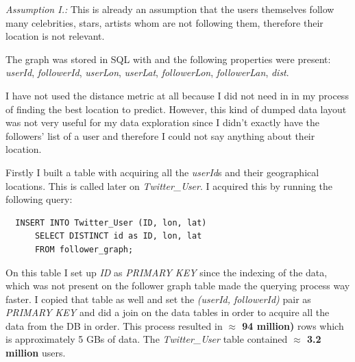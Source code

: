 \documentclass[a4paper,12pt]{article}
\begin{document}
\vspace{.2cm}

\par \textit{Assumption I.:} This is already an assumption that the users
themselves follow many celebrities, stars, artists whom are not following 
them, therefore their location is not relevant.

\vspace{.2cm}

\par The graph was stored in SQL with and the following properties were
present: \textit{userId}, \textit{followerId}, \textit{userLon}, \textit{userLat},
\textit{followerLon}, \textit{followerLan}, \textit{dist}.

\vspace{.2cm}

\par I have not used the distance metric at all because I did not need in
in my process of finding the best location to predict. However, this kind
of dumped data layout was not very useful for my data exploration since I
didn't exactly have the followers' list of a user and therefore I could not
say anything about their location.

\vspace{.2cm}

\par Firstly I built a table with acquiring all the \textit{userId}s and 
their geographical locations. This is called later on \textit{Twitter\_User}. 
I acquired this by running the following query:

\vspace{.2cm}

\lstset{language=SQL}
\lstset{frame=lines}
\lstset{basicstyle=\footnotesize}
\begin{lstlisting}
  INSERT INTO Twitter_User (ID, lon, lat)
      SELECT DISTINCT id as ID, lon, lat
      FROM follower_graph;
\end{lstlisting}

\vspace{.2cm}

\par On this table I set up \textit{ID} as \textit{PRIMARY KEY} since
the indexing of the data, which was not present on the follower graph table
made the querying process way faster. I copied that table as well and set
the \textit{(userId, followerId)} pair as \textit{PRIMARY KEY} and did a join
on the data tables in order to acquire all the data from the DB in order.
This process resulted in \textbf{$\approx$ 94 million)} rows which is approximately
5 GBs of data. The \textit{Twitter\_User} table contained \textbf{$\approx$ 3.2 million}
users.
\end{document}
